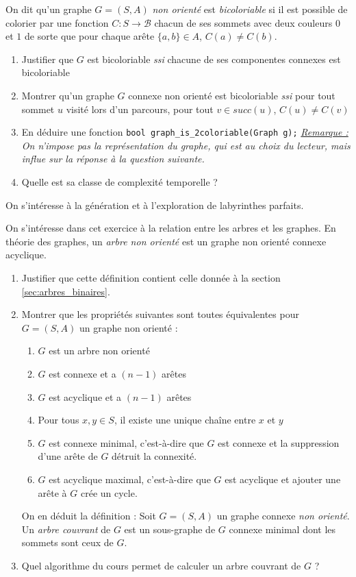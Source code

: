\documentclass[../../../main.tex]{subfiles}
\begin{document}
 On dit qu'un graphe $G = (S, A)$ \textit{non orienté} est \textit{bicoloriable} si il est possible de colorier par une fonction $C:S\rightarrow \mathcal{B}$ chacun de ses sommets avec deux couleurs $0$ et $1$ de sorte que pour chaque arête $\{a, b\}\in A$, $C(a)\neq C(b)$.
\begin{enumerate}
	\item Justifier que $G$ est bicoloriable \textit{ssi} chacune de ses componentes connexes est bicoloriable
	\item Montrer qu'un graphe $G$ connexe non orienté est bicoloriable \textit{ssi} pour tout sommet $u$ visité lors d'un parcours, pour tout $v\in succ(u)$, $C(u)\neq C(v)$ 
	\item En déduire une fonction \texttt{bool graph_is_2coloriable(Graph g);} \newline
	\textit{\underline{Remarque :} On n'impose pas la représentation du graphe, qui est au choix du lecteur, mais influe sur la réponse à la question suivante.}
	\item Quelle est sa classe de complexité temporelle ?
\end{enumerate}


 On s'intéresse à la génération et à l'exploration de labyrinthes parfaits.

 On s'intéresse dans cet exercice à la relation entre les arbres et les graphes.
 {
	En théorie des graphes, un \textit{arbre non orienté} est un graphe non orienté connexe acyclique.
}
\begin{enumerate}
	\item Justifier que cette définition contient celle donnée à la section \ref{sec:arbres_binaires}.
	\item Montrer que les propriétés suivantes sont toutes équivalentes pour $G = (S, A)$ un graphe non orienté :
	\begin{enumerate}
		\item $G$ est un arbre non orienté
		\item $G$ est connexe et a $(n-1)$ arêtes
		\item $G$ est acyclique et a $(n-1)$ arêtes
		\item Pour tous $x, y\in S$, il existe une unique chaîne entre $x$ et $y$
		\item $G$ est connexe minimal, c'est-à-dire que $G$ est connexe et la suppression d'une arête de $G$ détruit la connexité.
		\item $G$ est acyclique maximal, c'est-à-dire que $G$ est acyclique et ajouter une arête à $G$ crée un cycle.
	\end{enumerate}
	On en déduit la définition :
 {
	Soit $G = (S, A)$ un graphe connexe \textit{non orienté}. Un \textit{arbre couvrant} de $G$ est un sous-graphe de $G$ connexe minimal dont les sommets sont ceux de $G$.
}\vspace*{5mm}
	\item Quel algorithme du cours permet de calculer un arbre couvrant de $G$ ?
\end{enumerate}
\end{document}
